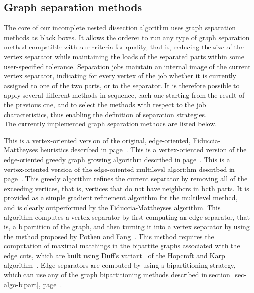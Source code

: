 \subsection{Graph separation methods}

The core of our incomplete nested dissection algorithm uses graph separation
methods as black boxes. It allows the orderer to run any type of graph
separation method compatible with our criteria for quality, that is,
reducing the size of the vertex separator while maintaining the loads of
the separated parts within some user-specified tolerance.
Separation jobs maintain an internal image of the current vertex separator,
indicating for every vertex of the job whether it is currently assigned to
one of the two parts, or to the separator.
It is therefore possible to apply several different methods in sequence,
each one starting from the result of the previous one,
and to select the methods with respect to the job characteristics, thus
enabling the definition of separation strategies.
\\

The currently implemented graph separation methods are listed below.
\begin{itemize}
This is a vertex-oriented version of the original, edge-oriented,
Fiduccia-Mattheyses heuristics described in page~\pageref{sec-algo-fme}.
This is a vertex-oriented version of the edge-oriented
greedy graph growing algorithm described in page~\pageref{sec-algo-ggge}.
This is a vertex-oriented version of the edge-oriented
multilevel algorithm described in page~\pageref{sec-algo-mle}.
This greedy algorithm refines the current separator by removing all of
the exceeding vertices, that is, vertices that do not have neighbors
in both parts. It is provided as a simple gradient refinement
algorithm for the multilevel method, and is clearly outperformed by
the Fiduccia-Mattheyses algorithm.
This algorithm computes a vertex separator by first computing an edge
separator, that is, a bipartition of the graph, and then turning it
into a vertex separator by using the method proposed by Pothen and
Fang~\cite{pofa90}. This method requires the computation of maximal
matchings in the bipartite graphs associated with the edge cuts, which
are built using Duff's variant~\cite{duff81} of the Hopcroft and Karp
algorithm~\cite{hoka73}.
Edge separators are computed by using a bipartitioning strategy,
which can use any of the graph bipartitioning methods described in
section~\ref{sec-algo-bipart}, page~\pageref{sec-algo-bipart}.
\end{itemize}
